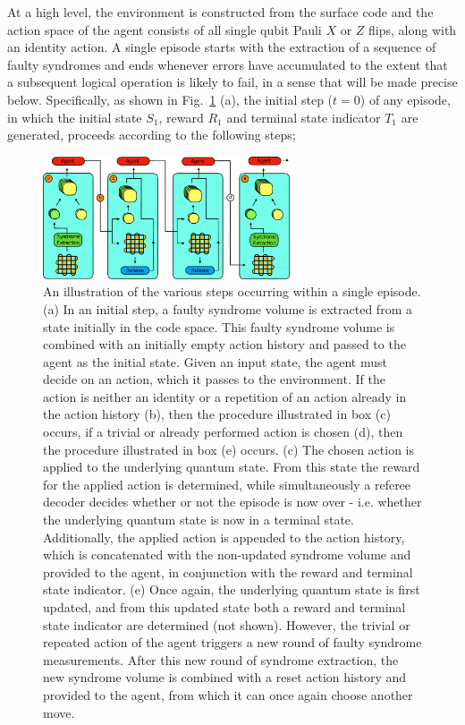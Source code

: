 \documentclass[twocolumn,preprintnumbers,amsmath,amssymb,notitlepage,nofootinbib,longbibliography,superscriptaddress,aps,pra,10pt]{revtex4-1}
\begin{document}
	At a high level, the environment is constructed from the surface code and the action space of the agent consists of all single qubit Pauli $X$ or $Z$ flips, along with an identity action. 
	A single episode starts with the extraction of a sequence of faulty syndromes and ends whenever errors have accumulated to the extent that a subsequent logical operation is likely to fail, in a sense that will be made precise below.
	Specifically, as shown in Fig.\ \ref{f:single_episode} (a),  the initial step ($t=0$) of any episode, in which the initial state $S_1$, reward $R_1$ and terminal state indicator $T_1$ are generated, proceeds according to the following steps;

	\begin{figure}
		\centering
		\includegraphics[width=0.65\textwidth]{figures/decoding_as_rl.pdf}
		\caption{
			An illustration of the various steps occurring within a single episode.
			(a) In an initial step, a faulty syndrome volume is extracted from a state initially in the code space.
			This faulty syndrome volume is combined with an initially empty action history and passed to the agent as the initial state.
			Given an input state, the agent must decide on an action, which it passes to the environment.
			If the action is neither an identity or a repetition of an action already in the action history (b), then the procedure illustrated in box (c) occurs, if a trivial or already performed action is chosen (d), then the procedure illustrated in box (e) occurs.
			(c) The chosen action is applied to the underlying quantum state.
			From this state the reward for the applied action is determined, while simultaneously a referee decoder decides whether or not the episode is now over - i.e.
			whether the underlying quantum state is now in a terminal state.
			Additionally, the applied action is appended to the action history, which is concatenated with the non-updated syndrome volume and provided to the agent, in conjunction with the reward and terminal state indicator.
			(e) Once again, the underlying quantum state is first updated, and from this updated state both a reward and terminal state indicator are determined (not shown).
			However, the trivial or repeated action of the agent triggers a new round of faulty syndrome measurements.
			After this new round of syndrome extraction, the new syndrome volume is combined with a reset action history and provided to the agent, from which it can once again choose another move.
		}
		\label{f:single_episode}
	\end{figure}
\end{document}
